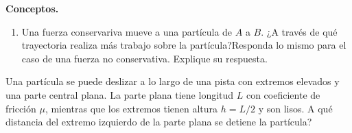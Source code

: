 \begin{mdframed}[style=warning]
	\begin{ejercicio}
		\textbf{Conceptos.}
		\begin{enumerate}
			\item Una fuerza conservariva mueve a una partícula de $A$ a $B$. ¿A través de qué trayectoria realiza más trabajo sobre la partícula?Responda lo mismo para el caso de una fuerza no conservativa. Explique su respuesta.
			\begin{center}
				
			\end{center}
		\end{enumerate}
	\end{ejercicio}
\end{mdframed}











\begin{mdframed}[style=warning]
	\begin{ejercicio}
		Una partícula se puede deslizar a lo largo de una pista con extremos elevados y una parte central plana. La parte plana tiene longitud $L$ con coeficiente de fricción $\mu$, mientras que los extremos tienen altura $h = L/2$ y son lisos. A qué distancia del extremo izquierdo de la parte plana se detiene la partícula?
	\end{ejercicio}
\end{mdframed}












